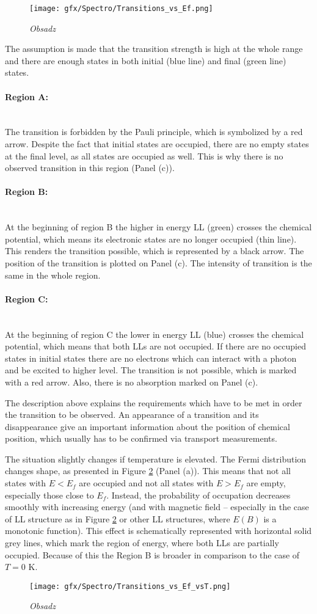 \documentclass[titlepage,a4paper]{book}
\newcommand{\wciecie}{\quad\phantom{v}}
\newcommand{\myparagraph}[1]{\paragraph{#1}\mbox{}\\}
\begin{document}
\begin{figure}[ht]
	\centering
	\texttt{[image: gfx/Spectro/Transitions\_vs\_Ef.png]}
	\vspace{-10pt}
	\caption{\textit{Obsadz}}
	\label{fig:Transitions_vs_Ef}
\end{figure}

The assumption is made that the transition strength is high at the whole range and there are enough states in both initial (blue line) and final (green line) states. 

\myparagraph{Region A:}
\wciecie
The transition is forbidden by the Pauli principle, which is symbolized by a red arrow. Despite the fact that initial states are occupied, there are no empty states at the final level, as all states are occupied as well. This is why there is no observed transition in this region (Panel (c)).

\myparagraph{Region B:}
\wciecie
At the beginning of region B the higher in energy LL (green) crosses the chemical potential, which means its electronic states are no longer occupied (thin line). This renders the transition possible, which is represented by a black arrow. The position of the transition is plotted on Panel (c). The intensity of transition is the same in the whole region.

\myparagraph{Region C:}
\wciecie
At the beginning of region C the lower in energy LL (blue) crosses the chemical potential, which means that both LLs are not occupied. If there are no occupied states in initial states there are no electrons which can interact with a photon and be excited to higher level. The transition is not possible, which is marked with a red arrow. Also, there is no absorption marked on Panel (c).
 
The description above explains the requirements which have to be met in order the transition to be observed. An appearance of a transition and its disappearance give an important information about the position of chemical position, which usually has to be confirmed via transport measurements.

The situation slightly changes if temperature is elevated. The Fermi distribution changes shape, as presented in Figure \ref{fig:Transitions_vs_Ef_vsT} (Panel (a)). This means that not all states with $E < E_f$ are occupied and not all states with $E > E_f$ are empty, especially those close to $E_f$. Instead, the probability of occupation decreases smoothly with increasing energy (and with magnetic field -- especially in the case of LL structure as in Figure \ref{fig:Transitions_vs_Ef_vsT} or other LL structures, where $E(B)$ is a monotonic function). This effect is schematically represented with horizontal solid grey lines, which mark the region of energy, where both LLs are partially occupied. Because of this the Region B is broader in comparison to the case of $T = 0$ K.
\begin{figure}[ht]
	\centering
	\texttt{[image: gfx/Spectro/Transitions\_vs\_Ef\_vsT.png]}
	\vspace{-10pt}
	\caption{\textit{Obsadz}}
	\label{fig:Transitions_vs_Ef_vsT}
\end{figure}
\end{document}
